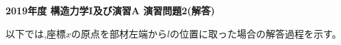 \documentclass[10pt,a4j]{jarticle}
\newlength{\minitwocolumn}
\begin{document}
\newcommand{\fat}[1]{\mbox{\boldmath $#1$}}
\newcommand{\D}{\partial}
\newcommand{\w}{\omega}
\newcommand{\ga}{\alpha}
\newcommand{\gb}{\beta}
\newcommand{\gx}{\xi}
\newcommand{\gz}{\zeta}
\newcommand{\vhat}[1]{\hat{\fat{#1}}}
\newcommand{\spc}{\vspace{0.7\baselineskip}}
\newcommand{\halfspc}{\vspace{0.3\baselineskip}}

\pagestyle{empty}
\newcommand{\twofig}[2]
 {
   \begin{figure}
     \begin{minipage}[t]{\minitwocolumn}
         \begin{center}   #1
         \end{center}
     \end{minipage}
         \hspace{\columnsep}
     \begin{minipage}[t]{\minitwocolumn}
         \begin{center} #2
         \end{center}
     \end{minipage}
   \end{figure}
 }
\begin{center}
{\Large \bf 2019年度 構造力学I及び演習A 演習問題2(解答)} \\
\end{center}
\vspace{15mm}
以下では,座標$x$の原点を部材左端から$l$の位置に取った場合の解答過程を示す。
\end{document}
